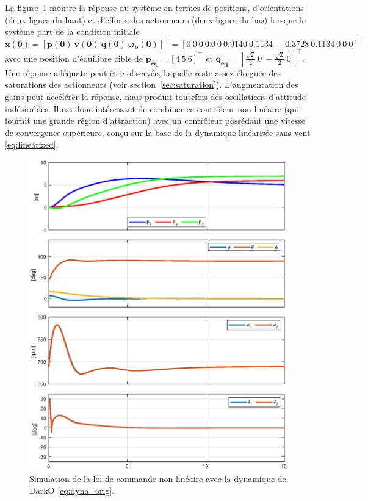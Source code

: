 La figure~\ref{fig_global_contol} montre la réponse du système en termes de positions, d'orientations (deux lignes du haut) et d'efforts des actionneurs (deux lignes du bas) lorsque le système part de la condition initiale $\boldsymbol{x(0)} = [\boldsymbol{p(0)}~ \boldsymbol{v(0)}~ \boldsymbol{q(0)}~ \boldsymbol{\omega_b(0)}]^\top = [0~0~0 ~ 0~0~0 ~0. 9140 ~0.1134~ -0.3728~ 0. 1134~ 0~ 0~ 0]^\top $ avec une position d'équilibre cible de $\boldsymbol{p_{\text{eq}}} = [4~5~6]^\top$ et $\boldsymbol{q_{\text{eq}}} = [\frac{\sqrt{2}}{2}~0~-\frac{\sqrt{2}}{2}~0]^\top$. 
Une réponse adéquate peut être observée, laquelle reste assez éloignée des saturations des actionneurs (voir section~\ref{sec:saturation}). L'augmentation des gains peut accélérer la réponse, mais produit toutefois des oscillations d'attitude indésirables. Il est donc intéressant de combiner ce contrôleur non linéaire (qui fournit une grande région d'attraction) avec un contrôleur possédant une vitesse de convergence supérieure, conçu sur la base de la dynamique linéarisée sans vent \eqref{eq:linearized}.


\begin{figure}[ht!]
    \centering
    \includegraphics[trim=0cm 0.6cm 0cm 0.6cm,clip,width=0.8\columnwidth]{figures/global2.eps}
    \caption{Simulation de la loi de commande non-linéaire avec la dynamique de DarkO \eqref{eq:dyna_orig}.}
    \label{fig_global_contol}
\end{figure}


